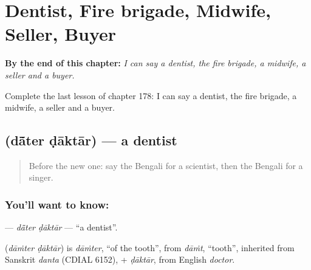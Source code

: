 
\chapter{Dentist, Fire brigade, Midwife, Seller, Buyer}
\label{ch:bn-dentist-fire-brigade-midwife-seller-buyer}

\begin{chapteropening}
\textbf{By the end of this chapter:} \emph{I can say a dentist, the fire brigade, a midwife, a seller and a buyer.}

Complete the last lesson of chapter 178: I can say a dentist, the fire brigade, a midwife, a seller and a buyer.
\end{chapteropening}

\section[\texorpdfstring{\bn{দাঁতের} \bn{ডাক্তার} (dā̃ter ḍāktār)}{দাঁতের ডাক্তার (dā̃ter ḍāktār)}]{  (dā̃ter ḍāktār) — a dentist}

\label{lesson:BN-C178-dater-daktar}



\begin{quote}
Before the new one: say the Bengali for a scientist, then the Bengali for a singer.
\end{quote}

\subsection*{You'll want to know:  }
\textbf{ } — \emph{dā̃ter ḍāktār} — \textquotedblleft{}a dentist\textquotedblright{}.

\begin{cousinweb}
\textbf{ } (\emph{dāṁter ḍāktār}) is \emph{dāṁter}, \textquotedblleft{}of the tooth\textquotedblright{}, from \emph{dāṁt}, \textquotedblleft{}tooth\textquotedblright{}, inherited from Sanskrit \emph{danta} (CDIAL 6152), + \emph{ḍāktār}, from English \emph{doctor}.
\end{cousinweb}


